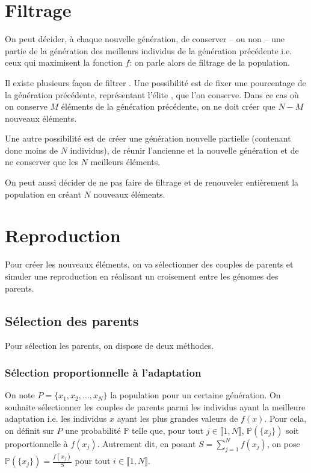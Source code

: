\section{Filtrage}

On peut décider, à chaque nouvelle génération, de conserver -- ou non -- une partie de la génération des meilleurs individus de la génération précédente i.e. ceux qui maximisent la fonction $f$: on parle alors de filtrage de la population.

Il existe plusieurs façon de \og filtrer \fg{}. Une possibilité est de fixer une pourcentage de la génération précédente, représentant l'\og élite \fg{}, que l'on conserve. Dans ce cas où on conserve $M$ éléments de la génération précédente, on ne doit créer que $N-M$ nouveaux éléments.

Une autre possibilité est de créer une génération nouvelle partielle (contenant donc moins de $N$ individus), de réunir l'ancienne et la nouvelle génération et de ne conserver que les $N$ meilleurs éléments.

On peut aussi décider de ne pas faire de filtrage et de renouveler entièrement la population en créant $N$ nouveaux éléments.

\section{Reproduction}

Pour créer les nouveaux éléments, on va sélectionner des couples de \og parents \fg{} et simuler une reproduction en réalisant un \og croisement \fg{} entre les génomes des parents. 

\subsection{Sélection des parents}

Pour sélection les parents, on dispose de deux méthodes.

\subsubsection{Sélection proportionnelle à l'adaptation}

On note $P=\{x_1,x_2,\ldots, x_N\}$ la population pour un certaine génération. On souhaite sélectionner les couples de parents parmi les individus ayant la meilleure adaptation i.e. les individus $x$ ayant les plus grandes valeurs de $f(x)$. Pour cela, on définit sur $P$ une probabilité $\mathbb{P}$ telle que, pour tout $j\in\llbracket 1, N \rrbracket$, $\mathbb{P}(\{x_j\})$ soit proportionnelle à $f(x_j)$. Autrement dit, en posant $S=\sum\limits_{j=1}^N f(x_j)$, on pose $\mathbb{P}(\{x_j\})=\frac{f(x_j)}{S}$ pour tout $i\in\llbracket 1, N\rrbracket$.

